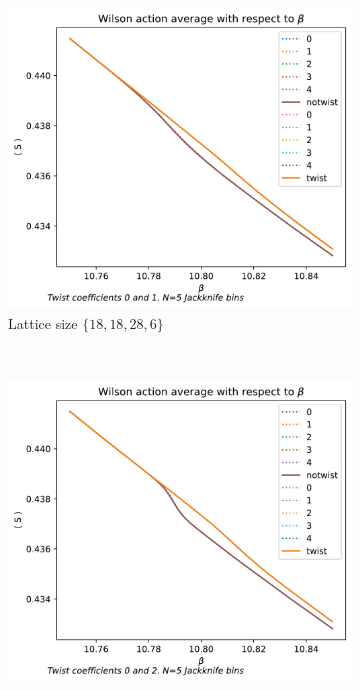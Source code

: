 \documentclass[english,twoside,openright]{UH_TCM_MSc}
\begin{document}
\begin{figure}[htpb]
    \centering
    \begin{subfigure}[t]{0.5\textwidth}
        \centering
        \includegraphics[width=\textwidth]{final_plots/18_18_28/action_0-1.pdf}
        \caption{Lattice size $\{18,18,28,6\}$}
    \end{subfigure}%
    ~ 
    \begin{subfigure}[t]{0.5\textwidth}
        \centering
        \includegraphics[width=\textwidth]{final_plots/24_24_36_highlight/action_0-2.pdf}

\end{subfigure}
\end{figure}
\end{document}
